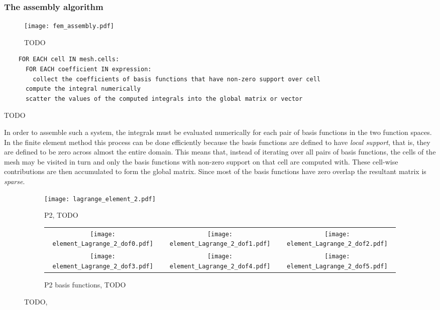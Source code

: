 \documentclass[thesis]{subfiles}
\begin{document}
\subsubsection{The assembly algorithm}

\begin{figure}
  \centering
  \texttt{[image: fem\_assembly.pdf]}
  \caption{TODO}
  \label{fig:fem_assembly}
\end{figure}

\begin{algorithm}
  \begin{verbatim}
    FOR EACH cell IN mesh.cells:
      FOR EACH coefficient IN expression:
        collect the coefficients of basis functions that have non-zero support over cell
      compute the integral numerically
      scatter the values of the computed integrals into the global matrix or vector
  \end{verbatim}
  \caption{TODO}
  \label{alg:fem_assembly}
\end{algorithm}

In order to assemble such a system, the integrals must be evaluated numerically for each pair of basis functions in the two function spaces.
In the finite element method this process can be done efficiently because the basis functions are defined to have \textit{local support}, that is, they are defined to be zero across almost the entire domain.
This means that, instead of iterating over all pairs of basis functions, the cells of the mesh may be visited in turn and only the basis functions with non-zero support on that cell are computed with.
These cell-wise contributions are then accumulated to form the global matrix.
Since most of the basis functions have zero overlap the resultant matrix is \textit{sparse}.

\begin{figure}
  \begin{subfigure}{.3\textwidth}
    \texttt{[image: lagrange\_element\_2.pdf]}
    \caption{P2, TODO}
    \label{fig:lagrange_element_2}
  \end{subfigure}
  \begin{subfigure}{.68\textwidth}
    \begin{tabular}{c c c}
      \texttt{[image: element\_Lagrange\_2\_dof0.pdf]}
      &
      \texttt{[image: element\_Lagrange\_2\_dof1.pdf]}
      &
      \texttt{[image: element\_Lagrange\_2\_dof2.pdf]}
      \\
      \texttt{[image: element\_Lagrange\_2\_dof3.pdf]}
      &
      \texttt{[image: element\_Lagrange\_2\_dof4.pdf]}
      &
      \texttt{[image: element\_Lagrange\_2\_dof5.pdf]}
    \end{tabular}
    \caption{P2 basis functions, TODO}
    \label{fig:lagrange_element_2_basis}
  \end{subfigure}
  \caption{TODO, \cite{defelement}}
\end{figure}
\end{document}
